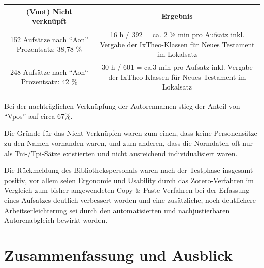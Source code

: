 \documentclass[a4paper,
fontsize=11pt,
oneside,
numbers=noperiodatend,
parskip=half-,
bibliography=totoc,
final
]{scrartcl}
\begin{document}
\begin{longtable}[c]{@{}cc@{}}
\toprule
\begin{minipage}[b]{0.34\columnwidth}\centering\strut
(Vnot) Nicht verknüpft
\strut\end{minipage} &
\begin{minipage}[b]{0.37\columnwidth}\centering\strut
Ergebnis
\strut\end{minipage}\tabularnewline
\midrule
\endhead
\begin{minipage}[t]{0.34\columnwidth}\centering\strut
152 Aufsätze nach \enquote{Aon} Prozentsatz: 38,78 \%
\strut\end{minipage} &
\begin{minipage}[t]{0.37\columnwidth}\centering\strut
16 h / 392 = ca. 2 ½ min pro Aufsatz inkl. Vergabe der IxTheo-Klassen
für Neues Testament im Lokalsatz
\strut\end{minipage}\tabularnewline
\begin{minipage}[t]{0.34\columnwidth}\centering\strut
248 Aufsätze nach ``Aon`` Prozentsatz: 42 \%
\strut\end{minipage} &
\begin{minipage}[t]{0.37\columnwidth}\centering\strut
30 h / 601 = ca.3 min pro Aufsatz inkl. Vergabe der IxTheo-Klassen für
Neues Testament im Lokalsatz
\strut\end{minipage}\tabularnewline
\bottomrule
\end{longtable}

Bei der nachträglichen Verknüpfung der Autorennamen stieg der Anteil von
\enquote{Vpos} auf circa 67\%.

Die Gründe für das Nicht-Verknüpfen waren zum einen, dass keine
Personensätze zu den Namen vorhanden waren, und zum anderen, dass die
Normdaten oft nur als Tni-/Tpi-Sätze existierten und nicht ausreichend
individualisiert waren.

Die Rückmeldung des Bibliothekspersonals waren nach der Testphase
insgesamt positiv, vor allem seien Ergonomie und Usability durch das
Zotero-Verfahren im Vergleich zum bisher angewendeten Copy \&
Paste-Verfahren bei der Erfassung eines Aufsatzes deutlich verbessert
worden und eine zusätzliche, noch deutlichere Arbeitserleichterung sei
durch den automatisierten und nachjustierbaren Autorenabgleich bewirkt
worden.

\section*{Zusammenfassung und
Ausblick}\label{zusammenfassung-und-ausblick}
\end{document}
